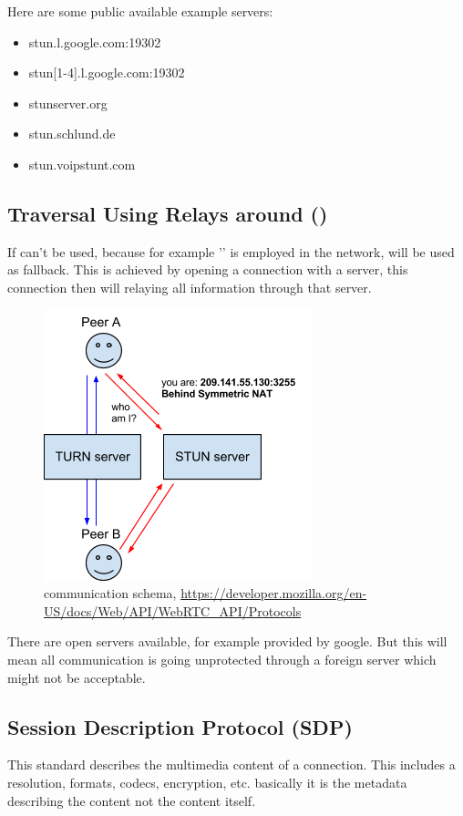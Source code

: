 Here are some public available example  servers:
\begin{itemize}
	\item stun.l.google.com:19302
	\item stun[1-4].l.google.com:19302
	\item stunserver.org
	\item stun.schlund.de
	\item stun.voipstunt.com
\end{itemize}

\clearpage
\subsection{Traversal Using Relays around  ()}
If  can't be used, because for example '' is employed in the network,  will be used as fallback. This is achieved by opening a connection with a  server, this connection then will relaying all information through that server.

\begin{figure}[H]
	\includegraphics[scale=0.5]{images/webrtc-turn.png}
	\centering
	\caption{ communication schema, \url{https://developer.mozilla.org/en-US/docs/Web/API/WebRTC_API/Protocols}}
	\label{fig:TURN}
\end{figure}

There are open  servers available, for example provided by google. But this will mean all communication is going unprotected through a foreign server which might not be acceptable.

\subsection{Session Description Protocol (SDP)}
This standard describes the multimedia content of a connection. This includes a resolution, formats, codecs, encryption, etc. basically it is the metadata describing the content not the content itself.

